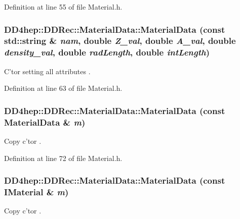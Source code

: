 Definition at line 55 of file Material.h.\hypertarget{class_d_d4hep_1_1_d_d_rec_1_1_material_data_adff4c3a5132ae55171ed9801b107d5fe}{
\subsubsection[{MaterialData}]{\setlength{\rightskip}{0pt plus 5cm}DD4hep::DDRec::MaterialData::MaterialData (const std::string \& {\em nam}, \/  double {\em Z\_\-val}, \/  double {\em A\_\-val}, \/  double {\em density\_\-val}, \/  double {\em radLength}, \/  double {\em intLength})}}
\label{class_d_d4hep_1_1_d_d_rec_1_1_material_data_adff4c3a5132ae55171ed9801b107d5fe}
C'tor setting all attributes . 

Definition at line 63 of file Material.h.\hypertarget{class_d_d4hep_1_1_d_d_rec_1_1_material_data_acd85ff17497787b8da9cf855d56cb663}{
\subsubsection[{MaterialData}]{\setlength{\rightskip}{0pt plus 5cm}DD4hep::DDRec::MaterialData::MaterialData (const {\bf MaterialData} \& {\em m})}}
\label{class_d_d4hep_1_1_d_d_rec_1_1_material_data_acd85ff17497787b8da9cf855d56cb663}
Copy c'tor . 

Definition at line 72 of file Material.h.\hypertarget{class_d_d4hep_1_1_d_d_rec_1_1_material_data_afc8ce700606b7690b0f86ba6e9db3787}{
\subsubsection[{MaterialData}]{\setlength{\rightskip}{0pt plus 5cm}DD4hep::DDRec::MaterialData::MaterialData (const {\bf IMaterial} \& {\em m})}}
\label{class_d_d4hep_1_1_d_d_rec_1_1_material_data_afc8ce700606b7690b0f86ba6e9db3787}
Copy c'tor . 

